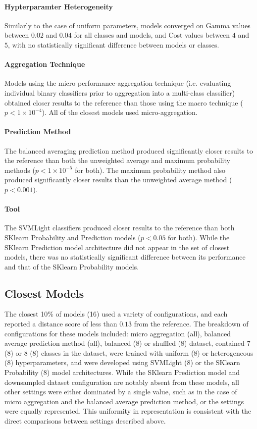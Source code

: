 \paragraph{Hypterparamter Heterogeneity}
Similarly to the case of uniform parameters, models converged on Gamma values between $0.02$ and $0.04$ for all classes
and models, and Cost values between $4$ and $5$, with no statistically significant difference between models or classes.

\paragraph{Aggregation Technique}
Models using the micro performance-aggregation technique (i.e. evaluating individual binary classifiers prior to
aggregation into a multi-class classifier) obtained closer results to the reference than those using the macro
technique ($p < 1\times 10^{-4}$). All of the closest models used micro-aggregation.

\paragraph{Prediction Method}
The balanced averaging prediction method produced significantly closer results to the reference than both the
unweighted average and maximum probability methods ($p < 1\times 10^{-5}$ for both). The maximum probability method
also produced significantly closer results than the unweighted average method ($p < 0.001$).

\paragraph{Tool}
The SVMLight classifiers produced closer results to the reference than both SKlearn Probability and Prediction models
($p < 0.05$ for both). While the SKlearn Prediction model architecture did not appear in the set of closest models,
there was no statistically significant difference between its performance and that of the SKlearn Probability models.

\subsection{Closest Models}
The closest 10\% of models (16) used a variety of configurations, and each reported a distance score of less than
$0.13$ from the reference. The breakdown of configurations for these models included: micro aggregation (all), balanced
average prediction method (all), balanced (8) or shuffled (8) dataset, contained 7 (8) or 8 (8) classes in the dataset,
were trained with uniform (8) or heterogeneous (8) hyperparameters, and were developed using SVMLight (8) or the
SKlearn Probability (8) model architectures. While the SKlearn Prediction model and downsampled dataset configuration
are notably absent from these models, all other settings were either dominated by a single value, such as in the case
of micro aggregation and the balanced average prediction method, or the settings were equally represented. This
uniformity in representation is consistent with the direct comparisons between settings described above.

